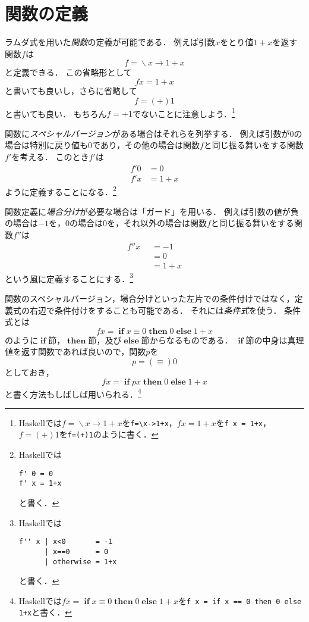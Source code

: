 \documentclass[twocolumn]{jsbook}
\newcommand{\mathKeyword}[1]{\mathbf{#1}}
\DeclareMathOperator{\mathElse}{\mathKeyword{else}}
\DeclareMathOperator{\mathIf}{\mathKeyword{if}}
\DeclareMathOperator{\mathLambda}{\backslash}
\DeclareMathOperator{\mathThen}{\mathKeyword{then}}
\newcommand{\mathLambdaArrow}{\rightarrow}
\newcommand{\mathOtherwise}{\mathKeyword{otherwise}}
\newcommand{\mathGuard}[1]{\mathop{\mid_{#1}}}
\newcommand{\mathLambdaExpression}[2]{\mathLambda#1\mathLambdaArrow#2}
\newcommand{\keyword}[1]{\emph{#1}}
\newcommand{\code}[1]{\texttt{#1}}
\newcommand{\binaryeq}{\equiv}
\newcommand{\keywordname}[1]{\mathbf{#1}}
\newcommand{\keywordif}{\mathop{\keywordname{if}}}
\newcommand{\keywordthen}{\mathop{\keywordname{then}}}
\newcommand{\keywordelse}{\mathop{\keywordname{else}}}
\begin{document}
\section{関数の定義}

ラムダ式を用いた\keyword{関数}の定義が可能である．
例えば引数$x$をとり値$1+x$を返す関数$f$は$$f=\mathLambdaExpression{x}{1+x}$$と定義できる．
この省略形として$$fx=1+x$$と書いても良いし，さらに省略して$$f=(+)1$$と書いても良い．
もちろん$f=+1$でないことに注意しよう．\footnote{Haskellでは$f=\mathLambdaExpression{x}{1+x}$を\code{f=\textbackslash x->1+x}，$fx=1+x$を\code{f x = 1+x}，$f=(+)1$を\code{f=(+)1}のように書く．}

関数に\keyword{スペシャルバージョン}がある場合はそれらを列挙する．
例えば引数が$0$の場合は特別に戻り値も$0$であり，その他の場合は関数$f$と同じ振る舞いをする関数$f'$を考える．
このとき$f'$は
\begin{equation*}
\begin{split}
f'0&=0\\
f'x&=1+x
\end{split}
\end{equation*}
ように定義することになる．\footnote{Haskellでは
\begin{Verbatim}[xleftmargin=10mm]
f' 0 = 0
f' x = 1+x
\end{Verbatim}
と書く．}

関数定義に\keyword{場合分け}が必要な場合は「ガード」を用いる．
例えば引数の値が負の場合は$-1$を，$0$の場合は$0$を，それ以外の場合は関数$f$と同じ振る舞いをする関数$f''$は
\begin{equation*}
\begin{split}
f''x&\mathGuard{x<0}=-1\\
&\mathGuard{x\equiv 0}=0\\
&\mathGuard{\mathOtherwise}=1+x
\end{split}
\end{equation*}
という風に定義することにする．\footnote{Haskellでは
\begin{Verbatim}[xleftmargin=10mm]
f'' x | x<0       = -1
      | x==0      = 0
      | otherwise = 1+x
\end{Verbatim}
と書く．}

関数のスペシャルバージョン，場合分けといった左片での条件付けではなく，定義式の右辺で条件付けをすることも可能である．
それには\keyword{条件式}を使う．
条件式とは
$$fx=\mathIf x\equiv0\mathThen0\mathElse1+x$$
のように$\mathIf$節，$\mathThen$節，及び$\mathElse$節からなるものである．
$\mathIf$節の中身は真理値を返す関数であれば良いので，関数$p$を$$p=(\equiv)0$$としておき，$$fx=\mathIf px\mathThen0\mathElse1+x$$と書く方法もしばしば用いられる．\footnote{Haskellでは$fx=\keywordif x\binaryeq0\keywordthen0\keywordelse1+x$を\code{f x = if x == 0 then 0 else 1+x}と書く．}
\end{document}
